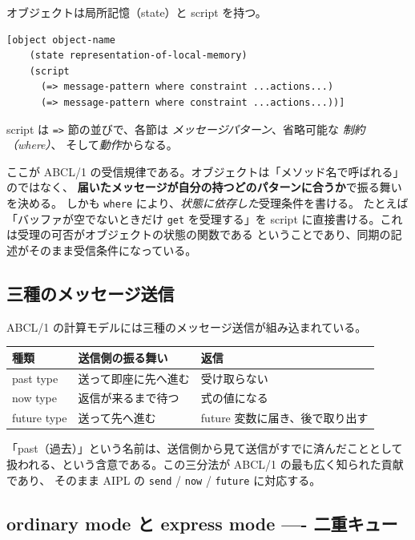 \documentclass[11pt,a4paper]{ltjsarticle}
\theoremstyle{remark}
\begin{document}
オブジェクトは局所記憶（state）と script を持つ。

\begin{lstlisting}[language=ABCL]
[object object-name
    (state representation-of-local-memory)
    (script
      (=> message-pattern where constraint ...actions...)
      (=> message-pattern where constraint ...actions...))]
\end{lstlisting}

script は \texttt{=>} 節の並びで、各節は
\emph{メッセージパターン}、省略可能な \emph{制約（where）}、
そして\emph{動作}からなる。

ここが ABCL/1 の受信規律である。オブジェクトは「メソッド名で呼ばれる」のではなく、
\textbf{届いたメッセージが自分の持つどのパターンに合うか}で振る舞いを決める。
しかも \texttt{where} により、\emph{状態に依存した}受理条件を書ける。
たとえば「バッファが空でないときだけ \texttt{get} を受理する」を
script に直接書ける。これは受理の可否がオブジェクトの状態の関数である
ということであり、同期の記述がそのまま受信条件になっている。

\subsection{三種のメッセージ送信}

ABCL/1 の計算モデルには三種のメッセージ送信が組み込まれている。

\begin{center}
\begin{tabular}{@{}lll@{}}
\toprule
種類 & 送信側の振る舞い & 返信 \\
\midrule
past type   & 送って即座に先へ進む & 受け取らない \\
now type    & 返信が来るまで待つ   & 式の値になる \\
future type & 送って先へ進む       & future 変数に届き、後で取り出す \\
\bottomrule
\end{tabular}
\end{center}

「past（過去）」という名前は、送信側から見て送信がすでに済んだこととして
扱われる、という含意である。この三分法が ABCL/1 の最も広く知られた貢献であり、
そのまま AIPL の \texttt{send} / \texttt{now} / \texttt{future} に対応する。

\subsection{ordinary mode と express mode ---- 二重キュー}
\end{document}
